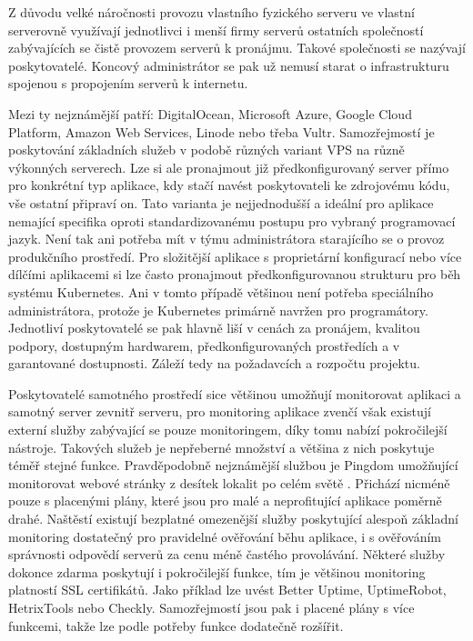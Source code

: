 		Z důvodu velké náročnosti provozu vlastního fyzického serveru ve vlastní serverovně využívají jednotlivci i menší firmy
		serverů ostatních společností zabývajících se čistě provozem serverů k pronájmu.
		Takové společnosti se nazývají poskytovatelé.
		Koncový administrátor se pak už nemusí starat o infrastrukturu spojenou s propojením serverů k internetu.

		Mezi ty nejznámější patří: DigitalOcean, Microsoft Azure, Google Cloud Platform, Amazon Web Services,
		Linode nebo třeba Vultr.
		Samozřejmostí je poskytování základních služeb v podobě různých variant \Ac{VPS} na různě výkonných serverech.
		Lze si ale pronajmout již předkonfigurovaný server přímo pro konkrétní typ aplikace, kdy stačí navést poskytovateli
		ke zdrojovému kódu, vše ostatní připraví on.
		Tato varianta je nejjednodušší a ideální pro aplikace nemající specifika oproti standardizovanému postupu
		pro vybraný programovací jazyk.
		Není tak ani potřeba mít v týmu administrátora starajícího se o provoz produkčního prostředí.
		Pro složitější aplikace s proprietární konfigurací nebo více dílčími aplikacemi si lze často pronajmout
		předkonfigurovanou strukturu pro běh systému Kubernetes.
		Ani v tomto případě většinou není potřeba speciálního administrátora, protože je Kubernetes primárně navržen
		pro programátory.
		Jednotliví poskytovatelé se pak hlavně liší v cenách za pronájem, kvalitou podpory, dostupným hardwarem, předkonfigurovaných
		prostředích a v garantované dostupnosti.
		Záleží tedy na požadavcích a rozpočtu projektu.

		Poskytovatelé samotného prostředí sice většinou umožňují monitorovat aplikaci a samotný server zevnitř serveru,
		pro monitoring aplikace zvenčí však existují externí služby zabývající se pouze monitoringem, díky tomu nabízí pokročilejší nástroje.
		Takových služeb je nepřeberné množství a většina z nich poskytuje téměř stejné funkce.
		Pravděpodobně nejznámější službou je Pingdom umožňující monitorovat webové stránky z desítek lokalit po celém
		světě \cite{pingdom}.
		Přichází nicméně pouze s placenými plány, které jsou pro malé a neprofitující aplikace poměrně drahé.
		Naštěstí existují bezplatné omezenější služby poskytující alespoň základní monitoring dostatečný pro pravidelné
		ověřování běhu aplikace, i s ověřováním správnosti odpovědí serverů za cenu méně častého provolávání.
		Některé služby dokonce zdarma poskytují i pokročilejší funkce, tím je většinou monitoring platností \ac{SSL} certifikátů.
		Jako příklad lze uvést Better Uptime, UptimeRobot, HetrixTools nebo Checkly.
		Samozřejmostí jsou pak i placené plány s více funkcemi, takže lze podle potřeby funkce dodatečně rozšířit.

